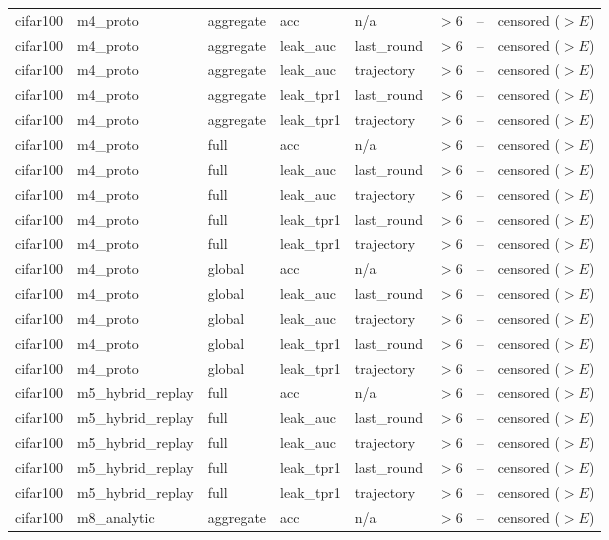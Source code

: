 \begin{tabular}{lllllrrl}
cifar100 & m4\_proto & aggregate & acc & n/a & $>$6 & -- & censored ($>E$) \\
cifar100 & m4\_proto & aggregate & leak\_auc & last\_round & $>$6 & -- & censored ($>E$) \\
cifar100 & m4\_proto & aggregate & leak\_auc & trajectory & $>$6 & -- & censored ($>E$) \\
cifar100 & m4\_proto & aggregate & leak\_tpr1 & last\_round & $>$6 & -- & censored ($>E$) \\
cifar100 & m4\_proto & aggregate & leak\_tpr1 & trajectory & $>$6 & -- & censored ($>E$) \\
cifar100 & m4\_proto & full & acc & n/a & $>$6 & -- & censored ($>E$) \\
cifar100 & m4\_proto & full & leak\_auc & last\_round & $>$6 & -- & censored ($>E$) \\
cifar100 & m4\_proto & full & leak\_auc & trajectory & $>$6 & -- & censored ($>E$) \\
cifar100 & m4\_proto & full & leak\_tpr1 & last\_round & $>$6 & -- & censored ($>E$) \\
cifar100 & m4\_proto & full & leak\_tpr1 & trajectory & $>$6 & -- & censored ($>E$) \\
cifar100 & m4\_proto & global & acc & n/a & $>$6 & -- & censored ($>E$) \\
cifar100 & m4\_proto & global & leak\_auc & last\_round & $>$6 & -- & censored ($>E$) \\
cifar100 & m4\_proto & global & leak\_auc & trajectory & $>$6 & -- & censored ($>E$) \\
cifar100 & m4\_proto & global & leak\_tpr1 & last\_round & $>$6 & -- & censored ($>E$) \\
cifar100 & m4\_proto & global & leak\_tpr1 & trajectory & $>$6 & -- & censored ($>E$) \\
cifar100 & m5\_hybrid\_replay & full & acc & n/a & $>$6 & -- & censored ($>E$) \\
cifar100 & m5\_hybrid\_replay & full & leak\_auc & last\_round & $>$6 & -- & censored ($>E$) \\
cifar100 & m5\_hybrid\_replay & full & leak\_auc & trajectory & $>$6 & -- & censored ($>E$) \\
cifar100 & m5\_hybrid\_replay & full & leak\_tpr1 & last\_round & $>$6 & -- & censored ($>E$) \\
cifar100 & m5\_hybrid\_replay & full & leak\_tpr1 & trajectory & $>$6 & -- & censored ($>E$) \\
cifar100 & m8\_analytic & aggregate & acc & n/a & $>$6 & -- & censored ($>E$) \\

\end{tabular}
